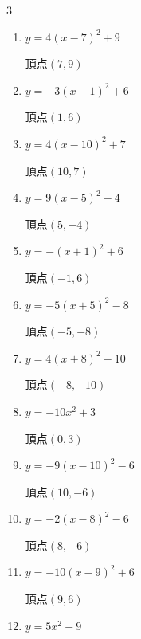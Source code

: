 \begin{multicols}{3}
\begin{enumerate}
  \item $\displaystyle y=4\left( x-7\right)^{2}+9$

        $\displaystyle 頂点\left( 7 , 9 \right)$

  \item $\displaystyle y=-3\left( x-1\right)^{2}+6$

        $\displaystyle 頂点\left( 1 , 6 \right)$

  \item $\displaystyle y=4\left( x-10\right)^{2}+7$

        $\displaystyle 頂点\left( 10 , 7 \right)$

\columnbreak %

  \item $\displaystyle y=9\left( x-5\right)^{2}-4$

        $\displaystyle 頂点\left( 5 , -4 \right)$

  \item $\displaystyle y=-\left( x+1\right)^{2}+6$

        $\displaystyle 頂点\left( -1 , 6 \right)$

  \item $\displaystyle y=-5\left( x+5\right)^{2}-8$

        $\displaystyle 頂点\left( -5 , -8 \right)$

  \item $\displaystyle y=4\left( x+8\right)^{2}-10$

        $\displaystyle 頂点\left( -8 , -10 \right)$

  \item $\displaystyle y=-10x^{2}+3$

        $\displaystyle 頂点\left( 0 , 3 \right)$

  \item $\displaystyle y=-9\left( x-10\right)^{2}-6$

        $\displaystyle 頂点\left( 10 , -6 \right)$

  \item $\displaystyle y=-2\left( x-8\right)^{2}-6$

        $\displaystyle 頂点\left( 8 , -6 \right)$

  \item $\displaystyle y=-10\left( x-9\right)^{2}+6$

        $\displaystyle 頂点\left( 9 , 6 \right)$

  \item $\displaystyle y=5x^{2}-9$


\end{enumerate}
\end{multicols}
